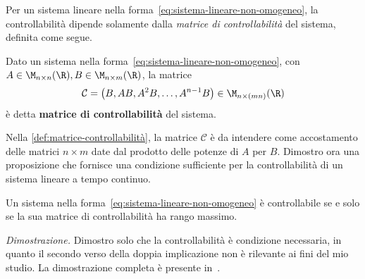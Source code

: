 Per un sistema lineare nella forma~\eqref{eq:sistema-lineare-non-omogeneo},
la controllabilità dipende solamente dalla \emph{matrice di controllabilità} del sistema, definita come segue.
\begin{definition}
    Dato un sistema nella forma~\eqref{eq:sistema-lineare-non-omogeneo}, con $A \in \M_{n\times n}(\R), B \in \M_{n\times m}(\R)$,
    la matrice
    \begin{equation*}
        \mathcal C = \left(B, AB, A^2B, \ldots, A^{n-1}B \right) \in \M_{n\times (mn)}(\R)
    \end{equation*}
    è detta \textbf{matrice di controllabilità} del sistema.
    \label{def:matrice-controllabilità}
\end{definition}
Nella \autoref{def:matrice-controllabilità}, la matrice $\mathcal C$ è
da intendere come accostamento delle matrici $n \times m$ date dal prodotto delle
potenze di $A$ per $B$.
Dimostro ora una proposizione che fornisce una condizione sufficiente per
la controllabilità di un sistema lineare a tempo continuo.

\begin{prop}
    Un sistema nella forma~\eqref{eq:sistema-lineare-non-omogeneo} è controllabile
    se e solo se la sua matrice di controllabilità ha rango massimo.
    \label{prop:condizione-controllabilità}
\end{prop}
\emph{Dimostrazione.}
Dimostro solo che la controllabilità è condizione necessaria, in quanto
il secondo verso della doppia implicazione non è rilevante ai fini del mio studio.
La dimostrazione completa è presente in~\cite{controllability-and-obs}.

